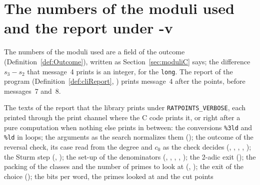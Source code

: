 \section{The numbers of the moduli used and the report under -v}\label{sec:moduliReport}

The numbers of the moduli used are a field of the outcome (Definition~\ref{def:Outcome}), written as
Section~\ref{sec:moduliC} says; the difference $s_3 - s_2$ that message~4 prints is an integer, for
the \verb|long|. The report of the program (Definition~\ref{def:cliReport},
) prints message~4 after the points, before messages~7 and~8.

\begin{definition}\label{def:report}
  \leanok
  The texts of the report that the library prints under \verb|RATPOINTS_VERBOSE|, each printed
  through the print channel where the C code prints it, or right after a pure computation when
  nothing else prints in between: the conversions \verb|%3ld| and \verb| %ld| in loops; the
  arguments as the search normalizes them (); the outcome of the
  reversal check, its case read from the degree and $c_0$ as the check decides
  (, ,
  , ,
  ); the Sturm step (,
  ); the set-up of the denominators
  (, ,
  , ,
  ); the 2-adic exit (); the
  packing of the classes and the number of primes to look at (,
  ); the exit of the choice
  (); the bits per word, the primes looked at and the cut points

\end{definition}
